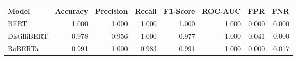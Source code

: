 \begin{tabular}{|l||r|r|r|r|r|r|r|}
\toprule
Model & \textbf{Accuracy} & \textbf{Precision} & Recall & \textbf{F1-Score} & \textbf{ROC-AUC} & \textbf{FPR} & FNR \\
\midrule \midrule
BERT & 1.000 & 1.000 & 1.000 & 1.000 & 1.000 & 0.000 & 0.000 \\
DistilliBERT & 0.978 & 0.956 & 1.000 & 0.977 & 1.000 & 0.041 & 0.000 \\
RoBERTa & 0.991 & 1.000 & 0.983 & 0.991 & 1.000 & 0.000 & 0.017 \\
\bottomrule
\end{tabular}
